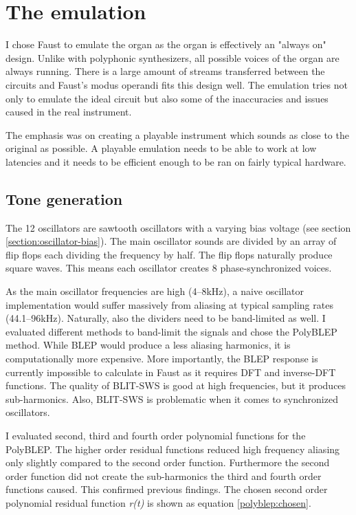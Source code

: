 \documentclass[11pt,a4paper]{article}
\begin{document}
\section{The emulation} 

I chose Faust to emulate the organ as the organ is effectively an "always on" design. Unlike with polyphonic synthesizers, all possible voices of the organ are always running. There is a large amount of streams transferred between the circuits and Faust's modus operandi fits this design well. The emulation tries not only to emulate the ideal circuit but also some of the inaccuracies and issues caused in the real instrument. 

The emphasis was on creating a playable instrument which sounds as close to the original as possible. A playable emulation needs to be able to work at low latencies and it needs to be efficient enough to be ran on fairly typical hardware.

\subsection{Tone generation}

The 12 oscillators are sawtooth oscillators with a varying bias voltage (see section \ref{section:oscillator-bias}). The main oscillator sounds are divided by an array of flip flops each dividing the frequency by half. The flip flops naturally produce square waves. This means each oscillator creates 8 phase-synchronized voices.

As the main oscillator frequencies are high (4--8kHz), a naive oscillator implementation would suffer massively from aliasing at typical sampling rates (44.1--96kHz). Naturally, also the dividers need to be band-limited as well. I evaluated different methods to band-limit the signals and chose the PolyBLEP\cite{antialiasing} method. While BLEP\cite{hardsync} would produce a less aliasing harmonics, it is computationally more expensive. More importantly, the BLEP response is currently impossible to calculate in Faust as it requires DFT and inverse-DFT functions. The quality of BLIT-SWS\cite{blit} is good at high frequencies, but it produces sub-harmonics\cite{antialiasing}. Also, BLIT-SWS is problematic when it comes to synchronized oscillators\cite{hardsync}.

I evaluated second, third and fourth order polynomial functions for the PolyBLEP. The higher order residual functions reduced high frequency aliasing only slightly compared to the second order function. Furthermore the second order function did not create the sub-harmonics the third and fourth order functions caused. This confirmed previous findings\cite{pekonen}. The chosen second order polynomial residual function \emph{r(t)} is shown as equation \ref{polyblep:chosen}.
\end{document}
